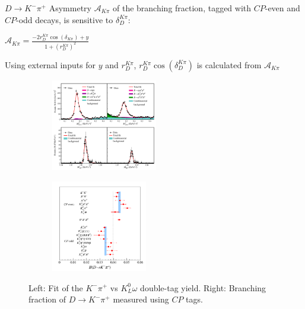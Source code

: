 \documentclass{beamer}
\begin{document}
\begin{frame}{$D\to K^-\pi^+$}
  \vspace{0.0cm}
  {\large Asymmetry $\mathcal{A}_{K\pi}$ of the branching fraction, tagged with $C\!P$-even and $C\!P$-odd decays, is sensitive to $\delta_D^{K\pi}$:}
  \begin{center}
    $\mathcal{A}_{K\pi} = \frac{-2r_D^{K\pi}\cos(\delta_{K\pi}) + y}{1 + (r_D^{K\pi})^2}$
  \end{center}
  Using external inputs for $y$ and $r_D^{K\pi}$, $r_D^{K\pi}\cos(\delta_D^{K\pi})$ is calculated from $\mathcal{A}_{K\pi}$
  \begin{figure}
    \centering
    \begin{subfigure}{0.5\textwidth}
      \centering
      \includegraphics[height=4.0cm,trim={0 8.6cm 9.4cm 0},clip=true]{Figures/Delta_Kpi_DT_Fits.pdf}
    \end{subfigure}%
    \begin{subfigure}{0.5\textwidth}
      \centering
      \includegraphics[height=4.0cm]{Figures/Delta_Kpi_Asymmetry.pdf}
    \end{subfigure}
    \caption*{Left: Fit of the $K^-\pi^+$ vs $K_L^0\omega$ double-tag yield. Right: Branching fraction of $D\to K^-\pi^+$ measured using $C\!P$ tags.}
  \end{figure}
\end{frame}
\end{document}

